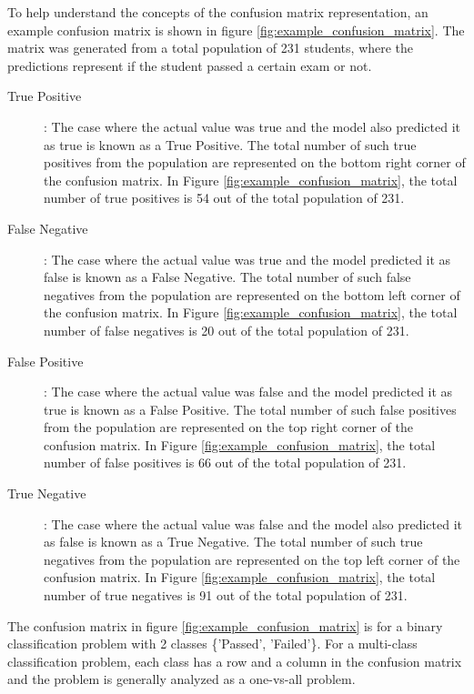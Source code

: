 \documentclass[11pt,openright]{report}
\begin{document}
To help understand the concepts of the confusion matrix representation, an example confusion matrix is shown in figure \ref{fig:example_confusion_matrix}. The matrix was generated from a total population of 231 students, where the predictions represent if the student passed a certain exam or not. 
\begin{description}
    \item[True Positive]: The case where the actual value was true and the model also predicted it as true is known as a True Positive. The total number of such true positives from the population are represented on the bottom right corner of the confusion matrix. In Figure \ref{fig:example_confusion_matrix}, the total number of true positives is 54 out of the total population of 231.

    \item[False Negative]: The case where the actual value was true and the model predicted it as false is known as a False Negative. The total number of such false negatives from the population are represented on the bottom left corner of the confusion matrix. In Figure \ref{fig:example_confusion_matrix}, the total number of false negatives is 20 out of the total population of 231.

     \item[False Positive]: The case where the actual value was false and the model predicted it as true is known as a False Positive. The total number of such false positives from the population are represented on the top right corner of the confusion matrix. In Figure \ref{fig:example_confusion_matrix}, the total number of false positives is 66 out of the total population of 231.
     
      \item[True Negative]: The case where the actual value was false and the model also predicted it as false is known as a True Negative. The total number of such true negatives from the population are represented on the top left corner of the confusion matrix. In Figure \ref{fig:example_confusion_matrix}, the total number of true negatives is 91 out of the total population of 231.
     
 \end{description}
 The confusion matrix in figure \ref{fig:example_confusion_matrix} is for a binary classification problem with 2 classes \{'Passed', 'Failed'\}. For a multi-class classification problem, each class has a row and a column in the confusion matrix and the problem is generally analyzed as a one-vs-all problem.
\end{document}

